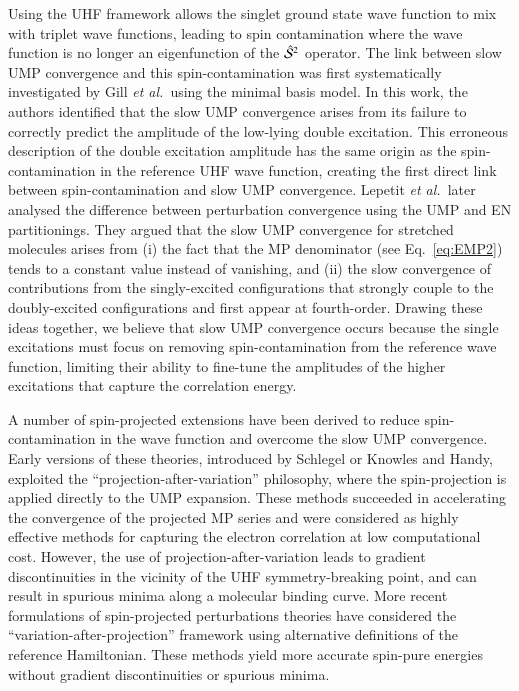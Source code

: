 \documentclass[aps,prb,reprint,noshowkeys,superscriptaddress]{revtex4-1}
\newcommand{\etal}{\textit{et al.}}
\newcommand{\cS}{\mathcal{S}}
\begin{document}
Using the UHF framework allows the singlet ground state wave function to mix with triplet wave functions, 
leading to spin contamination where the wave function is no longer an eigenfunction of the $\Hat{\cS}^2$ operator.
The link between slow UMP convergence and this spin-contamination was first systematically investigated
by Gill \etal\ using the minimal basis  model.\cite{Gill_1988}
In this work, the authors %
identified that the slow UMP convergence arises from its failure to correctly predict the amplitude of the
low-lying double excitation.
This erroneous description of the double excitation amplitude has the same origin as the spin-contamination in the reference
UHF wave function, creating the first direct link between spin-contamination and slow UMP convergence.\cite{Gill_1988}
%
Lepetit \etal\ later analysed the difference between perturbation convergence using the UMP 
and EN partitionings. \cite{Lepetit_1988}
They argued that the slow UMP convergence for stretched molecules arises from 
(i) the fact that the MP denominator (see Eq.~\ref{eq:EMP2})
tends to a constant value instead of vanishing, and (ii) the slow convergence of contributions from the 
singly-excited configurations that strongly couple to the doubly-excited configurations and first
appear at fourth-order.\cite{Lepetit_1988}
Drawing these ideas together, we believe that slow UMP convergence occurs because the single excitations must focus on removing
spin-contamination from the reference wave function, limiting their ability to fine-tune the amplitudes of the higher 
excitations that capture the correlation energy.

A number of spin-projected extensions have been derived to reduce spin-contamination in the wave function
and overcome the slow UMP convergence.
Early versions of these theories, introduced by Schlegel \cite{Schlegel_1986, Schlegel_1988} or 
Knowles and Handy,\cite{Knowles_1988a,Knowles_1988b} exploited the ``projection-after-variation'' philosophy,
where the spin-projection is applied directly to the UMP expansion.
These methods succeeded in accelerating the convergence of the projected MP series and were 
considered as highly effective methods for capturing the electron correlation at low computational cost.\cite{Knowles_1988b}
However, the use of projection-after-variation leads to gradient discontinuities in the vicinity of the UHF symmetry-breaking point,
and can result in spurious minima along a molecular binding curve.\cite{Schlegel_1986,Knowles_1988a}
More recent formulations of spin-projected perturbations theories have considered the  
``variation-after-projection'' framework using alternative definitions of the reference 
Hamiltonian.\cite{Tsuchimochi_2014,Tsuchimochi_2019}
These methods yield more accurate spin-pure energies without 
gradient discontinuities or spurious minima.
\end{document}
